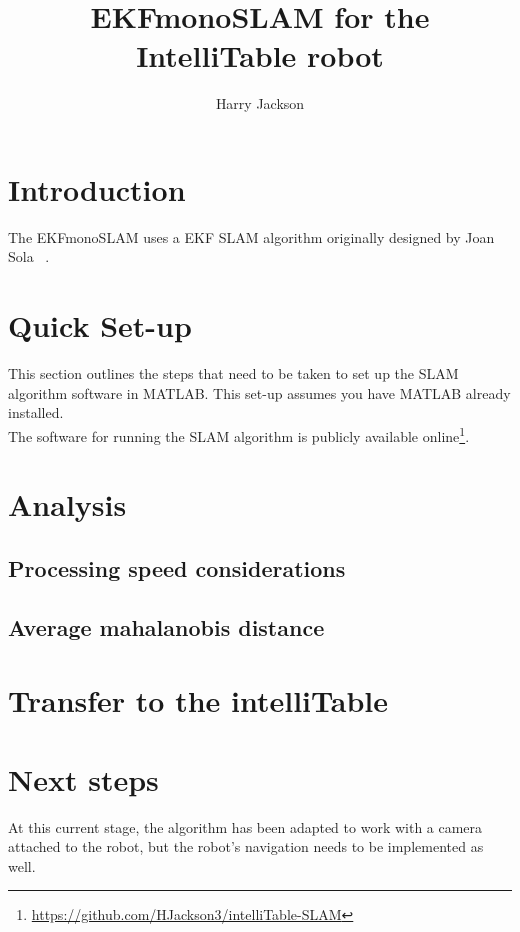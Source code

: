 \documentclass[11pt]{amsart}
\title{EKFmonoSLAM for the IntelliTable robot}
\author{Harry Jackson}
\begin{document}
\maketitle
\section{Introduction}
The EKFmonoSLAM uses a EKF SLAM algorithm originally designed by Joan Sola ~\cite{sola2012impact}.
\section{Quick Set-up}
This section outlines the steps that need to be taken to set up the SLAM algorithm software in MATLAB. This set-up assumes you have MATLAB already installed.
\\
The software for running the SLAM algorithm is publicly available online\footnote{\url{https://github.com/HJackson3/intelliTable-SLAM}}.

\section{Analysis}

\subsection{Processing speed considerations}

\subsection{Average mahalanobis distance}

\section{Transfer to the intelliTable}

\section{Next steps}
At this current stage, the algorithm has been adapted to work with a camera attached to the robot, but the robot's navigation needs to be implemented as well. 

\clearpage
{}

\end{document}
